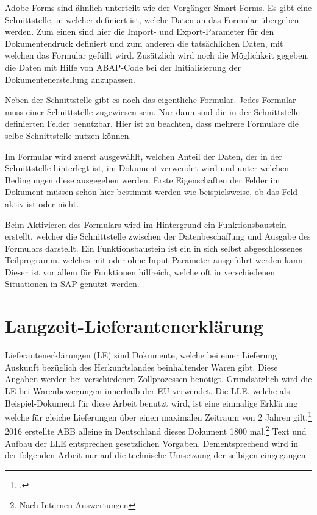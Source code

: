 Adobe Forms sind ähnlich unterteilt wie der Vorgänger Smart Forms. Es gibt eine Schnittstelle, in welcher definiert ist, welche Daten an das Formular übergeben werden. Zum einen sind hier die Import- und Export-Parameter für den Dokumentendruck definiert und zum anderen die tatsächlichen Daten, mit welchen das Formular gefüllt wird. Zusätzlich wird noch die Möglichkeit gegeben, die Daten mit Hilfe von \ac{ABAP}-Code bei der Initialisierung der Dokumentenerstellung anzupassen.

Neben der Schnittstelle gibt es noch das eigentliche Formular. Jedes Formular muss einer Schnittstelle zugewiesen sein. Nur dann sind die in der Schnittstelle definierten Felder benutzbar. Hier ist zu beachten, dass mehrere Formulare die selbe Schnittstelle nutzen können.

Im Formular wird zuerst ausgewählt, welchen Anteil der Daten, der in der Schnittstelle hinterlegt ist, im Dokument verwendet wird und unter welchen Bedingungen diese ausgegeben werden. Erste Eigenschaften der Felder im Dokument müssen schon hier bestimmt werden wie beispielsweise, ob das Feld aktiv ist oder nicht.

Beim Aktivieren des Formulars wird im Hintergrund ein Funktionsbaustein erstellt, welcher die Schnittstelle zwischen der Datenbeschaffung und Ausgabe des Formulars darstellt. Ein Funktionsbaustein ist ein in sich selbst abgeschlossenes Teilprogramm, welches mit oder ohne Input-Parameter ausgeführt werden kann. Dieser ist vor allem für Funktionen hilfreich, welche oft in verschiedenen Situationen in SAP genutzt werden.

       


\section{Langzeit-Lieferantenerklärung}

 Lieferantenerklärungen (LE) sind Dokumente, welche bei einer Lieferung Auskunft bezüglich des Herkunftslandes beinhaltender Waren gibt. Diese Angaben werden bei verschiedenen Zollprozessen benötigt. Grundsätzlich wird die \ac{LE} bei Warenbewegungen innerhalb der \ac{EU} verwendet. Die \ac{LLE}, welche als Beispiel-Dokument für diese Arbeit benutzt wird, ist eine einmalige Erklärung welche für gleiche Lieferungen über einen maximalen Zeitraum von 2 Jahren gilt.\footcite{ZOLL.2017} 2016 erstellte ABB alleine in Deutschland dieses Dokument 1800 mal.\footnote{Nach Internen Auswertungen} Text und Aufbau der \ac{LLE} entsprechen gesetzlichen Vorgaben. Dementsprechend wird in der folgenden Arbeit nur auf die technische Umsetzung der selbigen eingegangen.
